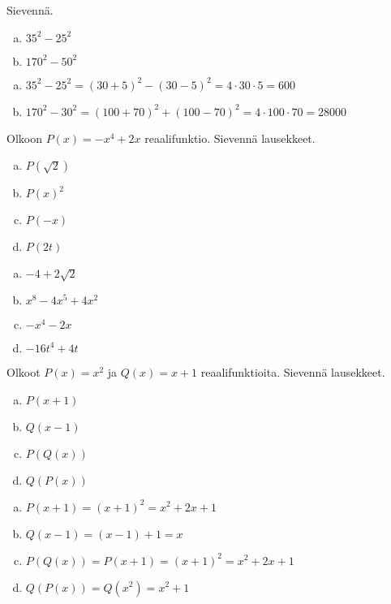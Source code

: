 \begin{tehtava}
    Sievennä.
    \begin{enumerate}[a)]
        \item $35^2-25^2$
        \item $170^2-50^2$
    \end{enumerate}
    \begin{vastaus}
        \begin{enumerate}[a)]
            \item $35^2-25^2 = (30+5)^2-(30-5)^2 = 4\cdot 30\cdot 5 = 600$
            \item $170^2-30^2 = (100+70)^2+(100-70)^2 = 4\cdot 100\cdot 70 = 28000$
        \end{enumerate}
    \end{vastaus}
\end{tehtava}

\begin{tehtava}
    Olkoon $P(x)=-x^4+2x$ reaalifunktio. Sievennä lausekkeet.
    \begin{enumerate}[a)]
		\item $P(\sqrt{2})$
        \item $P(x)^2$
        \item $P(-x)$
        \item $P(2t)$
    \end{enumerate}
    \begin{vastaus}
        \begin{enumerate}[a)]
            \item $-4 + 2\sqrt{2}$
            \item $x^8 - 4x^5 + 4x^2$
            \item $-x^4-2x$
            \item $-16t^4+4t$
        \end{enumerate}
    \end{vastaus}
\end{tehtava}

\begin{tehtava}
    Olkoot $P(x)=x^2$ ja $Q(x)=x+1$ reaalifunktioita. Sievennä lausekkeet.
    \begin{enumerate}[a)]
        \item $P(x+1)$
        \item $Q(x-1)$
        \item $P(Q(x))$
        \item $Q(P(x))$
    \end{enumerate}
    \begin{vastaus}
        \begin{enumerate}[a)]
            \item $P(x+1) = (x+1)^2 = x^2+2x+1$
            \item $Q(x-1) = (x-1)+1 = x$
            \item $P(Q(x)) = P(x+1) = (x+1)^2 = x^2+2x+1$
            \item $Q(P(x)) = Q(x^2) = x^2+1$
        \end{enumerate}
    \end{vastaus}
\end{tehtava}
